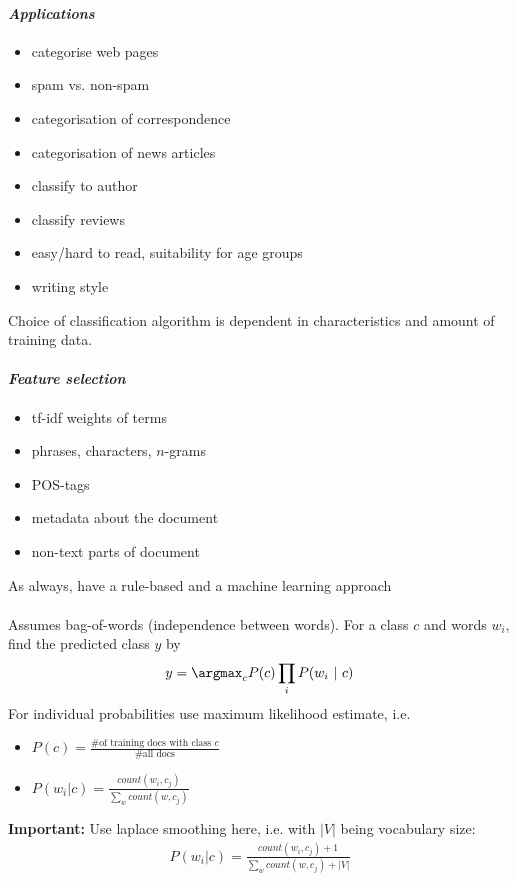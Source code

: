 \documentclass[10pt,twocolumn]{article}
\begin{document}
\paragraph{\textit{Applications}}
\begin{itemize}
\item categorise web pages
\item spam vs. non-spam
\item categorisation of correspondence
\item categorisation of news articles
\item classify to author
\item classify reviews
\item easy/hard to read, suitability for age groups
\item writing style
\end{itemize}


Choice of classification algorithm is dependent in characteristics and amount of
training data.

\paragraph{\textit{Feature selection}}
\begin{itemize}
\item tf-idf weights of terms
\item phrases, characters, $n$-grams
\item POS-tags
\item metadata about the document
\item non-text parts of document
\end{itemize}


As always, have a rule-based and a machine learning approach

\paragraph{ }  Assumes
bag-of-words (independence between words). For a class $c$ and words $w_i$, find
the predicted class $y$ by
\begin{align*}
  y = \argmax_c P(c) \prod_i P(w_i~|~c)
\end{align*}
For individual probabilities use maximum likelihood estimate, i.e.
\begin{itemize}
\item $P(c) = \frac{\text{\# of training docs with class $c$}}{\text{ \# all docs }}$
\item $P(w_i| c) = \frac{\mathit{count}(w_i, c_j)}{\sum_w \mathit{count}(w, c_j)}$
\end{itemize}
\textbf{Important:} Use laplace smoothing here, i.e. with $|V|$ being vocabulary size:
\begin{align*}
  P(w_i| c) = \frac{\mathit{count}(w_i, c_j) + 1}{\sum_w \mathit{count}(w, c_j) + |V|}
\end{align*}
\end{document}

